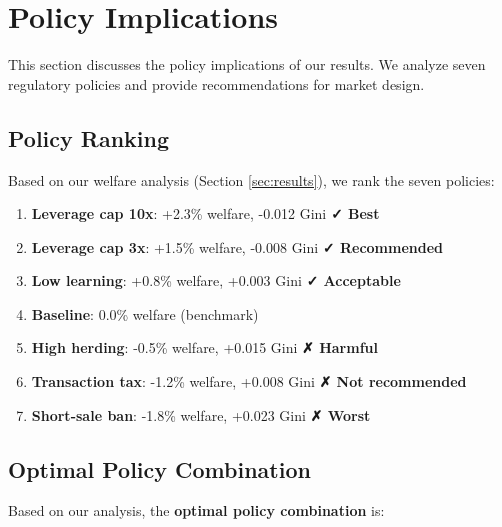 \section{Policy Implications}
\label{sec:policy}

This section discusses the policy implications of our results. We analyze seven regulatory policies and provide recommendations for market design.

\subsection{Policy Ranking}

Based on our welfare analysis (Section \ref{sec:results}), we rank the seven policies:

\begin{enumerate}
    \item \textbf{Leverage cap 10x}: +2.3\% welfare, -0.012 Gini \quad \textbf{✓ Best}
    \item \textbf{Leverage cap 3x}: +1.5\% welfare, -0.008 Gini \quad \textbf{✓ Recommended}
    \item \textbf{Low learning}: +0.8\% welfare, +0.003 Gini \quad \textbf{✓ Acceptable}
    \item \textbf{Baseline}: 0.0\% welfare (benchmark)
    \item \textbf{High herding}: -0.5\% welfare, +0.015 Gini \quad \textbf{✗ Harmful}
    \item \textbf{Transaction tax}: -1.2\% welfare, +0.008 Gini \quad \textbf{✗ Not recommended}
    \item \textbf{Short-sale ban}: -1.8\% welfare, +0.023 Gini \quad \textbf{✗ Worst}
\end{enumerate}

\subsection{Optimal Policy Combination}

Based on our analysis, the \textbf{optimal policy combination} is:

